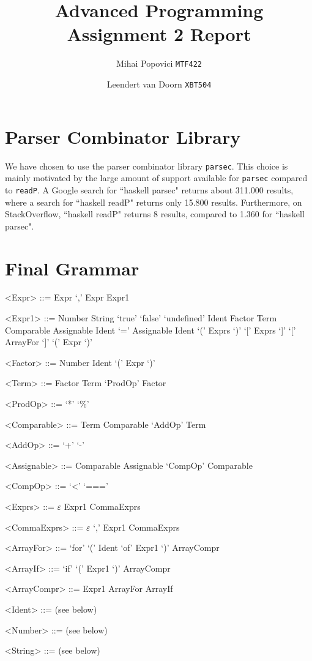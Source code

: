 \documentclass{article}
\title{Advanced Programming Assignment 2 Report}
\author{Mihai Popovici \texttt{MTF422} \and Leendert van Doorn \texttt{XBT504}}
\begin{document}
\maketitle




\section{Parser Combinator Library}
We have chosen to use the parser combinator library \texttt{parsec}. This choice is mainly motivated by the large amount of support available for \texttt{parsec} compared to \texttt{readP}. A Google search for ``haskell parsec" returns about 311.000 results, where a search for ``haskell readP" returns only 15.800 results. Furthermore, on StackOverflow, ``haskell readP" returns 8 results, compared to 1.360 for ``haskell parsec".

\section{Final Grammar}

\setlength{\grammarparsep}{4pt plus 1pt minus 1pt} %
\setlength{\grammarindent}{9em} %

\begin{grammar}
	\let\syntleft\relax
	\let\syntright\relax
	
	<Expr> ::= Expr `,' Expr
	\alt Expr1

	<Expr1> ::= Number
	\alt String
	\alt `true'
	\alt `false'
	\alt `undefined'
	\alt Ident
	\alt Factor
	\alt Term
	\alt Comparable
	\alt Assignable
	\alt Ident `=' Assignable
	\alt Ident `(' Exprs `)'
	\alt `[' Exprs `]'
	\alt `[' ArrayFor `]'
	\alt `(' Expr `)'
		
	<Factor> ::= Number
	\alt Ident
	\alt `(' Expr `)'
	
	<Term> ::= Factor
	\alt Term `ProdOp' Factor
	
	<ProdOp> ::= `*'
	\alt `\%'
	
	<Comparable> ::= Term
	\alt Comparable `AddOp' Term
	
	<AddOp> ::= `+'
	\alt `-'
	
	<Assignable> ::= Comparable
	\alt Assignable `CompOp' Comparable	
	
	<CompOp> ::= `<'
	\alt `==='
	
	<Exprs> ::= $\varepsilon$
	\alt Expr1 CommaExprs	
	
	<CommaExprs> ::= $\varepsilon$
	\alt `,' Expr1 CommaExprs
	
	<ArrayFor> ::= `for' `(' Ident `of' Expr1 `)' ArrayCompr
	
	<ArrayIf> ::= `if' `(' Expr1 `)' ArrayCompr
	
	<ArrayCompr> ::= Expr1
	\alt ArrayFor
	\alt ArrayIf
	
	<Ident> ::= (see below)
	
	<Number> ::= (see below)
	
	<String> ::= (see below)
\end{grammar}
\end{document}
